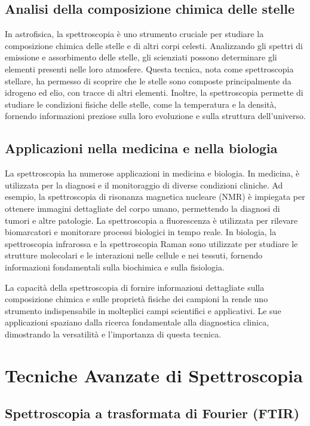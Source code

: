 \documentclass[12pt,a4paper]{report}
\begin{document}
\subsection{Analisi della composizione chimica delle stelle}

In astrofisica, la spettroscopia è uno strumento cruciale per studiare la composizione chimica delle stelle e di altri corpi celesti. Analizzando gli spettri di emissione e assorbimento delle stelle, gli scienziati possono determinare gli elementi presenti nelle loro atmosfere. Questa tecnica, nota come spettroscopia stellare, ha permesso di scoprire che le stelle sono composte principalmente da idrogeno ed elio, con tracce di altri elementi. Inoltre, la spettroscopia permette di studiare le condizioni fisiche delle stelle, come la temperatura e la densità, fornendo informazioni preziose sulla loro evoluzione e sulla struttura dell'universo.

\subsection{Applicazioni nella medicina e nella biologia}

La spettroscopia ha numerose applicazioni in medicina e biologia. In medicina, è utilizzata per la diagnosi e il monitoraggio di diverse condizioni cliniche. Ad esempio, la spettroscopia di risonanza magnetica nucleare (NMR) è impiegata per ottenere immagini dettagliate del corpo umano, permettendo la diagnosi di tumori e altre patologie. La spettroscopia a fluorescenza è utilizzata per rilevare biomarcatori e monitorare processi biologici in tempo reale. In biologia, la spettroscopia infrarossa e la spettroscopia Raman sono utilizzate per studiare le strutture molecolari e le interazioni nelle cellule e nei tessuti, fornendo informazioni fondamentali sulla biochimica e sulla fisiologia.

La capacità della spettroscopia di fornire informazioni dettagliate sulla composizione chimica e sulle proprietà fisiche dei campioni la rende uno strumento indispensabile in molteplici campi scientifici e applicativi. Le sue applicazioni spaziano dalla ricerca fondamentale alla diagnostica clinica, dimostrando la versatilità e l'importanza di questa tecnica.

\section{Tecniche Avanzate di Spettroscopia}

\subsection{Spettroscopia a trasformata di Fourier (FTIR)}
\end{document}

